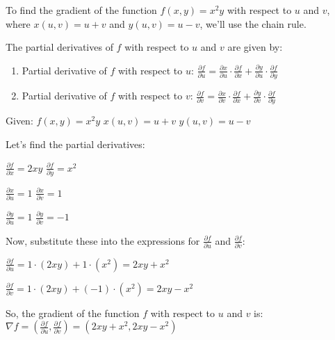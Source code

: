 \documentclass[11pt]{article}
\makeatletter
\newcommand{\boxspacing}{\kern\kvtcb@left@rule\kern\kvtcb@boxsep}
\newcommand{\prompt}[4]{
        {\ttfamily\llap{{\color{#2}[#3]:\hspace{3pt}#4}}\vspace{-\baselineskip}}
    }
\makeatother
\begin{document}
    To find the gradient of the function $ f(x, y) = x^2y $ with
respect to $ u $ and $ v $, where $ x(u, v) = u + v $ and $ y(u,
v) = u - v $, we'll use the chain rule.

The partial derivatives of $ f $ with respect to $ u $ and $ v $
are given by:

\begin{enumerate}
\def\labelenumi{\arabic{enumi}.}
\item
  Partial derivative of $ f $ with respect to $ u $: $
  \frac{\partial f}{\partial u} = \frac{\partial x}{\partial u}
  \cdot \frac{\partial f}{\partial x} + \frac{\partial y}{\partial u}
  \cdot \frac{\partial f}{\partial y} $
\item
  Partial derivative of $ f $ with respect to $ v $: $
  \frac{\partial f}{\partial v} = \frac{\partial x}{\partial v}
  \cdot \frac{\partial f}{\partial x} + \frac{\partial y}{\partial v}
  \cdot \frac{\partial f}{\partial y} $
\end{enumerate}

Given: $ f(x, y) = x^2y $ $ x(u, v) = u + v $ $ y(u, v) = u - v
$

Let's find the partial derivatives:

$ \frac{\partial f}{\partial x} = 2xy $ $
\frac{\partial f}{\partial y} = x^2 $

$ \frac{\partial x}{\partial u} = 1 $ $ \frac{\partial x}{\partial v}
= 1 $

$ \frac{\partial y}{\partial u} = 1 $ $ \frac{\partial y}{\partial v}
= -1 $

Now, substitute these into the expressions for $
\frac{\partial f}{\partial u} $ and $ \frac{\partial f}{\partial v}
$:

$ \frac{\partial f}{\partial u} = 1 \cdot (2xy) + 1 \cdot (x^2) =
2xy + x^2 $

$ \frac{\partial f}{\partial v} = 1 \cdot (2xy) + (-1) \cdot (x^2) =
2xy - x^2 $

So, the gradient of the function $ f $ with respect to $ u $ and $
v $ is: $ \nabla f = \left( \frac{\partial f}{\partial u},
\frac{\partial f}{\partial v} \right) = (2xy + x^2, 2xy - x^2) $

    \begin{tcolorbox}[breakable, size=fbox, boxrule=1pt, pad at break*=1mm,colback=cellbackground, colframe=cellborder]
\prompt{In}{incolor}{ }{\boxspacing}
\begin{Verbatim}[commandchars=\\\{\}]

\end{Verbatim}
\end{tcolorbox}
\end{document}
